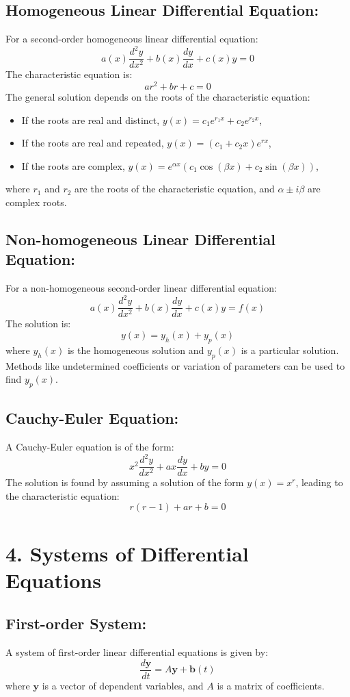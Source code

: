 \documentclass[../Main.tex]{subfiles}
\begin{document}
\subsection*{Homogeneous Linear Differential Equation:}
For a second-order homogeneous linear differential equation:
\[
a(x) \frac{d^2y}{dx^2} + b(x) \frac{dy}{dx} + c(x) y = 0
\]
The characteristic equation is:
\[
ar^2 + br + c = 0
\]
The general solution depends on the roots of the characteristic equation:
\begin{itemize}
    \item If the roots are real and distinct, \( y(x) = c_1 e^{r_1 x} + c_2 e^{r_2 x} \),
    \item If the roots are real and repeated, \( y(x) = (c_1 + c_2 x) e^{r x} \),
    \item If the roots are complex, \( y(x) = e^{\alpha x} \left( c_1 \cos(\beta x) + c_2 \sin(\beta x) \right) \),
\end{itemize}
where \( r_1 \) and \( r_2 \) are the roots of the characteristic equation, and \( \alpha \pm i\beta \) are complex roots.

\subsection*{Non-homogeneous Linear Differential Equation:}
For a non-homogeneous second-order linear differential equation:
\[
a(x) \frac{d^2y}{dx^2} + b(x) \frac{dy}{dx} + c(x) y = f(x)
\]
The solution is:
\[
y(x) = y_h(x) + y_p(x)
\]
where \( y_h(x) \) is the homogeneous solution and \( y_p(x) \) is a particular solution. Methods like undetermined coefficients or variation of parameters can be used to find \( y_p(x) \).

\subsection*{Cauchy-Euler Equation:}
A Cauchy-Euler equation is of the form:
\[
x^2 \frac{d^2y}{dx^2} + ax \frac{dy}{dx} + by = 0
\]
The solution is found by assuming a solution of the form \( y(x) = x^r \), leading to the characteristic equation:
\[
r(r-1) + ar + b = 0
\]

\section*{4. Systems of Differential Equations}

\subsection*{First-order System:}
A system of first-order linear differential equations is given by:
\[
\frac{d\mathbf{y}}{dt} = A\mathbf{y} + \mathbf{b}(t)
\]
where \( \mathbf{y} \) is a vector of dependent variables, and \( A \) is a matrix of coefficients.
\end{document}
